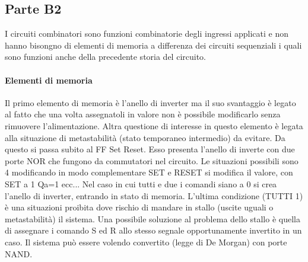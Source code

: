 \documentclass[12pt]{article}
\begin{document}
\subsection{Parte B2}\label{b2}
I circuiti combinatori sono funzioni combinatorie degli ingressi applicati e non hanno bisongno di elementi di memoria a differenza dei circuiti sequenziali i quali sono funzioni anche della precedente storia del circuito.

\paragraph{Elementi di memoria}
Il primo elemento di memoria è l'anello di inverter ma il suo svantaggio è legato al fatto che una volta assegnatoli in valore non è possibile modificarlo senza rimuovere l'alimentazione. Altra questione di interesse in questo elemento è legata alla situazione di metastabilità (stato temporaneo intermedio) da evitare. Da questo si passa subito al FF Set Reset. Esso presenta l'anello di inverte con due porte NOR che fungono da commutatori nel circuito. Le situazioni possibili sono 4 modificando in modo complementare SET e RESET si modifica il valore, con SET a 1 Qa=1 ecc... Nel caso in cui tutti e due i comandi siano a 0 si crea l'anello di inverter, entrando in stato di memoria. L'ultima condizione (TUTTI 1) è una situazioni proibita dove rischio di mandare in stallo (uscite uguali o metastabilità) il sistema. Una possibile soluzione al problema dello stallo è quella di assegnare i comando S ed R allo stesso segnale opportunamente invertito in un caso. Il sistema può essere volendo convertito (legge di De Morgan) con porte NAND.
\end{document}
